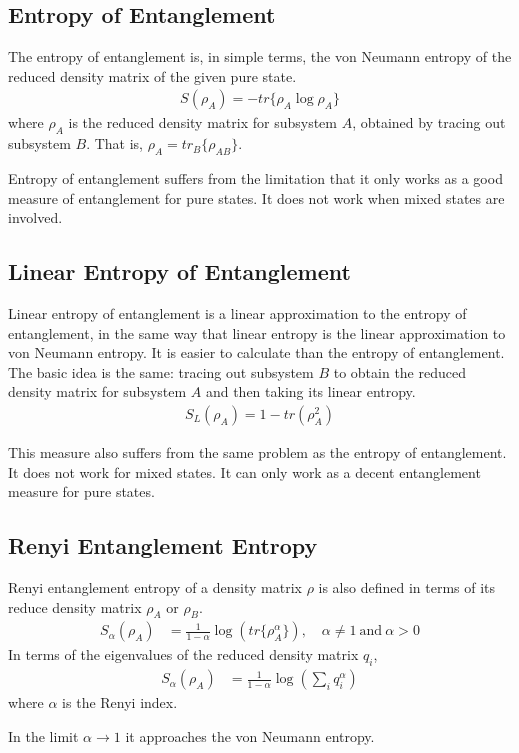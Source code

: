 \subsection{Entropy of Entanglement}
\par The entropy of entanglement is, in simple terms, the von Neumann entropy of the reduced density matrix of the given pure state.
\begin{align*}
S(\rho_A) = - tr \{ \rho_A \log \rho_A \}
\end{align*}
where $\rho_A$ is the reduced density matrix for subsystem $A$, obtained by tracing out subsystem $B$. That is, $\rho_A = tr_B \{\rho_{AB}\}$.
\par Entropy of entanglement suffers from the limitation that it only works as a good measure of entanglement for pure states. It does not work when mixed states are involved.

\subsection{Linear Entropy of Entanglement}
\par Linear entropy of entanglement is a linear approximation to the entropy of entanglement, in the same way that linear entropy is the linear approximation to von Neumann entropy. It is easier to calculate than the entropy of entanglement. The basic idea is the same: tracing out subsystem $B$ to obtain the reduced density matrix for subsystem $A$ and then taking its linear entropy.
\begin{align*}
S_L(\rho_A) = 1 - tr(\rho_A^2)
\end{align*}
\par This measure also suffers from the same problem as the entropy of entanglement. It does not work for mixed states. It can only work as a decent entanglement measure for pure states.

\subsection{Renyi Entanglement Entropy}
Renyi entanglement entropy of a density matrix $\rho$ is also defined in terms of its reduce density matrix $\rho_A$ or $\rho_B$.
\begin{align*}
S_\alpha (\rho_A) &= \frac{1}{1-\alpha} \log (tr\{\rho_A^\alpha\}) , \quad \alpha \neq 1 \: \text{and} \: \alpha > 0
\end{align*}
In terms of the eigenvalues of the reduced density matrix $q_i$,
\begin{align*}
S_\alpha (\rho_A) &= \frac{1}{1-\alpha} \log \left( \sum_i q_i^\alpha \right)
\end{align*}
where $\alpha$ is the Renyi index.
\par In the limit $\alpha \rightarrow 1$ it approaches the von Neumann entropy.

